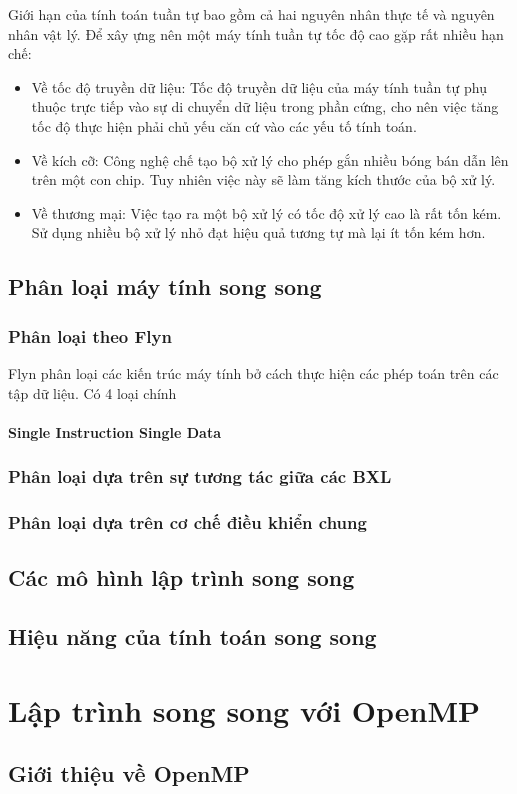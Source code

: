 \documentclass{report}
\begin{document}
Giới hạn của tính toán tuần tự bao gồm cả hai nguyên nhân thực tế và nguyên nhân vật lý. Để xây ựng nên một máy tính tuần tự tốc độ cao gặp rất nhiều hạn chế:
\begin{itemize}
\item Về tốc độ truyền dữ liệu: Tốc độ truyền dữ liệu của máy tính tuần tự phụ thuộc trực tiếp vào sự di chuyển dữ liệu trong phần cứng, cho nên việc tăng tốc độ thực hiện phải chủ yếu căn cứ vào các yếu tố tính toán.
\item Về kích cỡ: Công nghệ chế tạo bộ xử lý cho phép gắn nhiều bóng bán dẫn lên trên một con chip. Tuy nhiên việc này sẽ làm tăng kích thước của bộ xử lý.
\item Về thương mại: Việc tạo ra một bộ xử lý có tốc độ xử lý cao là rất tốn kém. Sử dụng nhiều bộ xử lý nhỏ đạt hiệu quả tương tự mà lại ít tốn kém hơn.
\end{itemize}

\section{Phân loại máy tính song song}
\subsection{Phân loại theo Flyn}
Flyn phân loại các kiến trúc máy tính bở cách thực hiện các phép toán trên các tập dữ liệu. Có 4 loại chính
\subsubsection{Single Instruction Single Data}
\subsection{Phân loại dựa trên sự tương tác giữa các BXL}
\subsection{Phân loại dựa trên cơ chế điều khiển chung}
\section{Các mô hình lập trình song song}
\section{Hiệu năng của tính toán song song}
\chapter{Lập trình song song với OpenMP}
\section{Giới thiệu về OpenMP}
\end{document}
